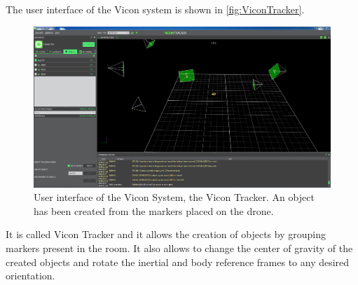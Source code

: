 The user interface of the Vicon system is shown in \autoref{fig:ViconTracker}. 
\begin{figure}[H]
	\centering
	\includegraphics[scale=0.27]{figures/ViconTracker}
	\caption{User interface of the Vicon System, the Vicon Tracker. An object has been created from the markers placed on the drone.}
	\label{fig:ViconTracker}
\end{figure}
It is called Vicon Tracker and it allows the creation of objects by grouping markers present in the room. It also allows to change the center of gravity of the created objects and rotate the inertial and body reference frames to any desired orientation.